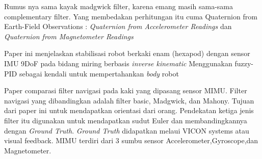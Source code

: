\documentclass{article}
\begin{document}
Rumus nya sama kayak madgwick filter, karena emang masih sama-sama complementary filter. Yang membedakan perhitungan itu cuma Quaternion from Earth-Field Observations :\emph{ Quaternion from Accelerometer Readings} dan \emph{ Quaternion from Magnetometer Readings}

\cite{Asrofi2015} Paper ini menjelaskan stabilisasi robot berkaki enam (hexapod) dengan sensor IMU 9DoF pada bidang miring berbasis \emph{inverse kinematic}
Menggunakan fuzzy-PID sebagai kendali untuk mempertahankan \emph{body} robot

\cite{Ludwig2018} Paper comparasi filter navigasi pada  kaki yang dipasang sensor MIMU. Filter navigasi yang dibandingkan adalah filter basic, Madgwick, dan Mahony. Tujuan dari paper ini untuk mendapatkan orientasi dari orang. Pendekatan ketiga jenis filter itu digunakan untuk mendapatkan sudut Euler dan membandingkannya dengan \emph{Ground Truth}. \emph{Ground Truth} didapatkan melaui VICON systems atau visual feedback.
MIMU terdiri dari 3 sumbu sensor Accelerometer,Gyroscope,dan Magnetometer.


\end{document}
